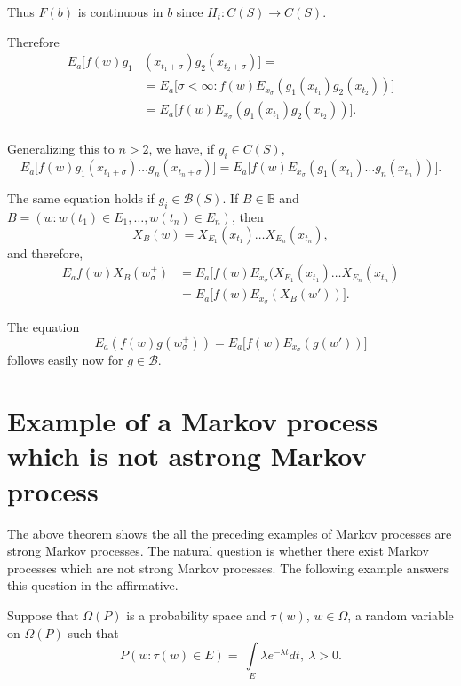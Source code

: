 Thus $F (b)$ is continuous in $b$ since $H_t : C (S) \to C (S)$.

Therefore
\begin{align*}
E_a  \big [ f (w) g_1 &( x_{t_{1} + \sigma}) g_2 (x_{t_{2} + \sigma}) \big ] = \\
  &= E_a \big [ \sigma < \infty : f(w) E_{x_\sigma} (g_1 (x_{t_{1}})
    g_2 (x_{t_{2}})) \big ]\\ 
  &= E_a \big [ f (w) E_{x_{\sigma}}  (g_1 (x_{t_{1}}) g_2 (x_{t_{2}})) \big ]. \\
\end{align*}\pageoriginale

Generalizing this to  $n > 2$, we have, if  $g_i \in C (S)$,
$$
E_a  \big [ f (w) g_1 ( x_{t_{1} + \sigma})  \ldots g_n (x_{t_{n} +
    \sigma}) \big ] = E_a  \big [ f (w) E_{x_{\sigma}} ( g_1 (
  x_{t_{1}}) \ldots  g_n (x_{t_{n}})) \big ]. 
$$

The same equation holds if $g_i \in \mathscr{B} (S)$. If $B \in
\mathbb{B}$ and $B = ( w : w (t_1) \in E_1, \ldots , w (t_n) \in E_n
)$, then  
$$
X_B (w) = X_{E_{1}} (x_{t_{1}}) \ldots X_{E_{n}} (x_{t_{n}}),
$$
and therefore,
\begin{align*}
  E_a f(w) X_B (w^+_\sigma) &=  E_a \big [ f (w) E_{x_{\sigma}}
    (X_{E_{1}} ( x_{t_{1}}) \ldots X_{E_{n}} (x_{t_{n}}) \\ 
    &= E_a \big [ f (w) E_{x_{\sigma}} (X_B (w')) \big ].
\end{align*}

The equation
$$
E_a (f (w) g (w^+_\sigma)) = E_a \big [ f  (w) E_{x_{\sigma}} (g(w')) \big ]
$$
follows easily now for $g \in \mathscr{B}$.

\section[Example of a Markov process....]{Example of a Markov process  which is not a\break strong Markov
  process}\label{chap2-sec5} 



The above theorem shows the all the preceding examples of  
Markov\pageoriginale
processes are strong Markov processes. The natural question is whether
there exist Markov processes which are not strong Markov
processes. The following example answers this question in the
affirmative. 

Suppose that $\Omega (P)$ is a probability space and $\tau (w)$, $w
\in \Omega$, a random variable on $\Omega (P)$ such that  
$$
P ( w : \tau (w) \in E ) = ~ \int \limits_{E} \lambda e^{-\lambda t}
dt, ~ \lambda > 0. 
$$


